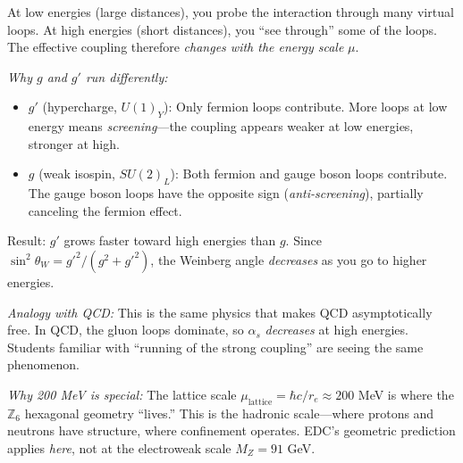 \begin{tcolorbox}[colback=yellow!5, colframe=orange!60!black,
  title={Historical Note: How This Chapter Evolved}, breakable]
\begin{center}
\end{center}

At low energies (large distances), you probe the interaction through many virtual loops.
At high energies (short distances), you ``see through'' some of the loops.
The effective coupling therefore \emph{changes with the energy scale} $\mu$.

\emph{Why $g$ and $g'$ run differently:}

\begin{itemize}
\item $g'$ (hypercharge, $U(1)_Y$): Only fermion loops contribute. More loops at low energy
      means \emph{screening}---the coupling appears weaker at low energies, stronger at high.
\item $g$ (weak isospin, $SU(2)_L$): Both fermion and gauge boson loops contribute.
      The gauge boson loops have the opposite sign (\emph{anti-screening}), partially
      canceling the fermion effect.
\end{itemize}

Result: $g'$ grows faster toward high energies than $g$. Since $\sin^2\theta_W = g'^2/(g^2 + g'^2)$,
the Weinberg angle \emph{decreases} as you go to higher energies.

\emph{Analogy with QCD:} This is the same physics that makes QCD asymptotically free.
In QCD, the gluon loops dominate, so $\alpha_s$ \emph{decreases} at high energies.
Students familiar with ``running of the strong coupling'' are seeing the same phenomenon.

\emph{Why 200 MeV is special:} The lattice scale $\mu_{\text{lattice}} = \hbar c / r_e \approx 200$ MeV
is where the $\mathbb{Z}_6$ hexagonal geometry ``lives.'' This is the hadronic scale---where
protons and neutrons have structure, where confinement operates. EDC's geometric prediction
applies \emph{here}, not at the electroweak scale $M_Z = 91$ GeV.


\end{tcolorbox}
